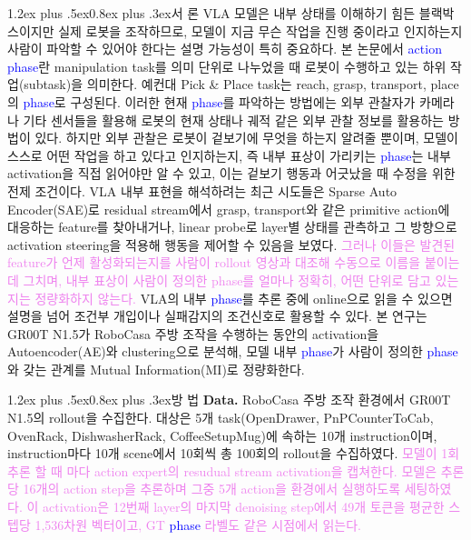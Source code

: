 \documentclass[a4paper,twocolumn,9pt]{extarticle}
\makeatletter
\newcommand{\term}[1]{\textcolor{blue}{#1}}  %
\newcommand{\rev}[1]{\textcolor{violet}{#1}}  %
\renewcommand\section{\@startsection{section}{1}{\z@}%
  {1.2ex plus .5ex}{0.8ex plus .3ex}{\normalsize\bfseries}}
\makeatother
\begin{document}
\section{서 론}
VLA 모델은 내부 상태를 이해하기 힘든 블랙박스이지만 실제 로봇을 조작하므로, 모델이 지금 무슨 작업을 진행 중이라고 인지하는지 사람이 파악할 수 있어야 한다는 설명 가능성이 특히 중요하다. 본 논문에서 \term{action phase}란 manipulation task를 의미 단위로 나누었을 때 로봇이 수행하고 있는 하위 작업(subtask)을 의미한다. 예컨대 Pick \& Place task는 reach, grasp, transport, place의 \term{phase}로 구성된다\cite{options}. 이러한 현재 \term{phase}를 파악하는 방법에는 외부 관찰자가 카메라나 기타 센서들을 활용해 로봇의 현재 상태나 궤적 같은 외부 관찰 정보를 활용하는 방법이 있다\cite{lotus}. 하지만 외부 관찰은 로봇이 겉보기에 무엇을 하는지 알려줄 뿐이며, 모델이 스스로 어떤 작업을 하고 있다고 인지하는지, 즉 내부 표상이 가리키는 \term{phase}는 내부 activation을 직접 읽어야만 알 수 있고, 이는 겉보기 행동과 어긋났을 때 수정을 위한 전제 조건이다. VLA 내부 표현을 해석하려는 최근 시도들은
Sparse Auto Encoder(SAE)로 residual stream에서 grasp, transport와 같은 primitive action에 대응하는 feature를 찾아내거나\cite{saevla,egsae}, linear probe로 layer별 상태를 관측하고 그 방향으로 activation steering을 적용해 행동을 제어할 수 있음을 보였다\cite{observing,mechinterp}. \rev{그러나 이들은 발견된 feature가 언제 활성화되는지를 사람이 rollout 영상과 대조해 수동으로 이름을 붙이는 데 그치며, 내부 표상이 사람이 정의한 phase를 얼마나 정확히, 어떤 단위로 담고 있는지는 정량화하지 않는다.} VLA의 내부 \term{phase}를 추론 중에 online으로 읽을 수 있으면 설명을 넘어 조건부 개입이나 실패감지\cite{safe}의 조건신호로 활용할 수 있다. 본 연구는 GR00T N1.5\cite{groot}가 RoboCasa\cite{robocasa} 주방 조작을 수행하는 동안의 activation을 Autoencoder(AE)와 clustering으로 분석해, 모델 내부 \term{phase}가 사람이 정의한 \term{phase}와 갖는 관계를 Mutual Information(MI)로 정량화한다. 

\section{방 법}
\textbf{Data. } RoboCasa 주방 조작 환경에서 GR00T N1.5의 rollout을 수집한다. 대상은 5개 task(OpenDrawer, PnPCounterToCab, OvenRack, DishwasherRack, CoffeeSetupMug)에 속하는 10개 instruction이며, instruction마다 10개 scene에서 10회씩 총 100회의 rollout을 수집하였다. \rev{모델이 1회 추론 할 때 마다 action expert의 resudual stream activation을 캡쳐한다. 모델은 추론당 16개의 action step을 추론하며 그중 5개 action을 환경에서 실행하도록 세팅하였다. 이 activation은 12번째 layer의 마지막 denoising step에서 49개 토큰을 평균한 스텝당 1{,}536차원 벡터이고, GT \term{phase} 라벨도 같은 시점에서 읽는다.}
\end{document}
